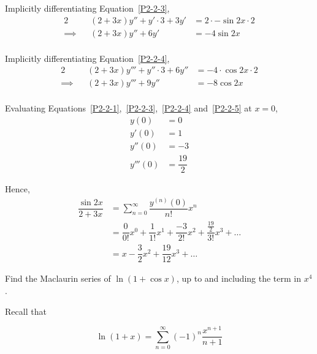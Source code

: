 \documentclass{jhwhw}
\begin{document}
            Implicitly differentiating Equation~\ref{P2-2-3},
            \begin{alignat}{2}
                &&(2+3x)y'' + y' \cdot 3 + 3y' &= 2\cdot-\sin 2x \cdot 2\nonumber\\
                \implies&& (2+3x)y'' + 6y' &= -4\sin 2x\label{P2-2-4}\\\nonumber
            \end{alignat}

            Implicitly differentiating Equation~\ref{P2-2-4},
            \begin{alignat}{2}
                && (2+3x)y''' + y'' \cdot 3 + 6y'' &= -4\cdot \cos 2x \cdot 2\nonumber\\
                \implies&& (2+3x)y''' + 9y'' &= -8\cos 2x\label{P2-2-5}\\\nonumber
            \end{alignat}

            Evaluating Equations~\ref{P2-2-1},~\ref{P2-2-3},~\ref{P2-2-4} and~\ref{P2-2-5} at $x = 0$,
            \begin{align*}
                y(0) &= 0\\
                y'(0) &= 1\\
                y''(0) &= -3\\
                y'''(0) &= \dfrac{19}2
            \end{align*}

            Hence,
            \begin{align*}
                \dfrac{\sin 2x}{2 + 3x} &= \sum_{n=0}^\infty \dfrac{y^{(n)}(0)}{n!}x^n\\
                &= \dfrac{0}{0!}x^0 + \dfrac{1}{1!}x^1 + \dfrac{-3}{2!}x^2 + \dfrac{\frac{19}2}{3!}x^3 + \ldots\\
                &= x - \dfrac32 x^2 + \dfrac{19}{12}x^3+\ldots
            \end{align*}



    \problem{}
        Find the Maclaurin series of $\ln (1 + \cos x)$, up to and including the term in $x^4$.

    \solution
        Recall that 

        \begin{equation*}
            \ln (1 + x) = \sum_{n=0}^\infty (-1)^n \dfrac{x^{n+1}}{n+1}
        \end{equation*}
\end{document}
